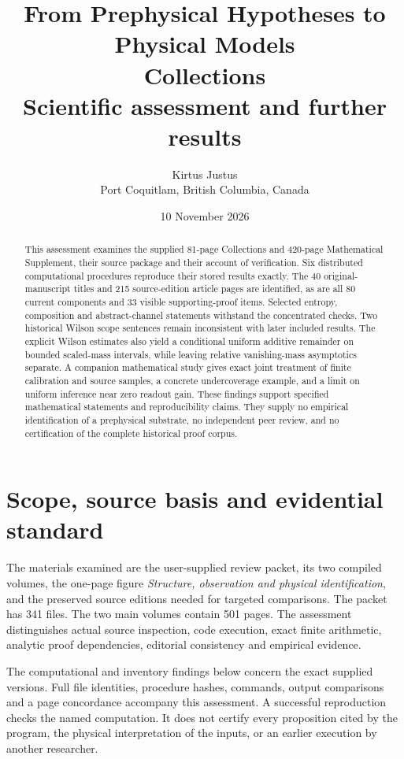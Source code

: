 \documentclass[11pt,a4paper]{article}
\title{\color{ink}\sffamily From Prephysical Hypotheses to Physical Models\\[7pt]\Large Collections\\[7pt]\large Scientific assessment and further results}
\author{Kirtus Justus\\\small Port Coquitlam, British Columbia, Canada}
\date{10 November 2026}
\begin{document}
\maketitle
\begin{abstract}
This assessment examines the supplied 81-page Collections and 420-page Mathematical Supplement, their source package and their account of verification. Six distributed computational procedures reproduce their stored results exactly. The 40 original-manuscript titles and 215 source-edition article pages are identified, as are all 80 current components and 33 visible supporting-proof items. Selected entropy, composition and abstract-channel statements withstand the concentrated checks. Two historical Wilson scope sentences remain inconsistent with later included results. The explicit Wilson estimates also yield a conditional uniform additive remainder on bounded scaled-mass intervals, while leaving relative vanishing-mass asymptotics separate. A companion mathematical study gives exact joint treatment of finite calibration and source samples, a concrete undercoverage example, and a limit on uniform inference near zero readout gain. These findings support specified mathematical statements and reproducibility claims. They supply no empirical identification of a prephysical substrate, no independent peer review, and no certification of the complete historical proof corpus.
\end{abstract}
\tableofcontents
\newpage
\section{Scope, source basis and evidential standard}

The materials examined are the user-supplied review packet, its two compiled volumes, the one-page figure \emph{Structure, observation and physical identification}, and the preserved source editions needed for targeted comparisons. The packet has 341 files. The two main volumes contain 501 pages. The assessment distinguishes actual source inspection, code execution, exact finite arithmetic, analytic proof dependencies, editorial consistency and empirical evidence.

The computational and inventory findings below concern the exact supplied versions. Full file identities, procedure hashes, commands, output comparisons and a page concordance accompany this assessment. A successful reproduction checks the named computation. It does not certify every proposition cited by the program, the physical interpretation of the inputs, or an earlier execution by another researcher.
\end{document}
